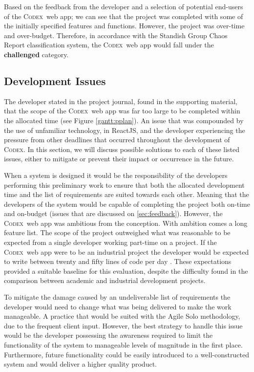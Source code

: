 \documentclass[final]{cmpreport}
\newcommand{\Codex}{\textsc{Codex}}
\begin{document}
		Based on the feedback from the developer and a selection of potential end-users of the \Codex \ web app; we can see that the project was completed with some of the initially specified features and functions. However, the project was over-time and over-budget. Therefore, in accordance with the Standish Group Chaos Report classification system, the \Codex \ web app would fall under the \textbf{challenged} category.
		
		\subsection{Development Issues} \label{sec:dev-eval}
		The developer stated in the project journal, found in the supporting material, that the scope of the \Codex \ web app was far too large to be completed within the allocated time (see Figure \ref{gantt:pplan}). An issue that was compounded by the use of unfamiliar technology, in ReactJS, and the developer experiencing the pressure from other deadlines that occurred throughout the development of \Codex. In this section, we will discuss possible solutions to each of these listed issues, either to mitigate or prevent their impact or occurrence in the future. 
		
		When a system is designed it would be the responsibility of the developers performing this preliminary work to ensure that both the allocated development time and the list of requirements are suited towards each other. Meaning that the developers of the system would be capable of completing the project both on-time and on-budget (issues that are discussed on \ref{sec:feedback}). However, the \Codex \ web app was ambitious from the conception. With ambition comes a long feature list. The scope of the project outweighed what was reasonable to be expected from a single developer working part-time on a project. If the \Codex \ web app were to be an industrial project the developer would be expected to write between twenty and fifty lines of code per day \citep{dev-metrics}. These expectations provided a suitable baseline for this evaluation, despite the difficulty found in the comparison between academic and industrial development projects.
		
		To mitigate the damage caused by an undeliverable list of requirements the developer would need to change what was being delivered to make the work manageable. A practice that would be suited with the Agile Solo methodology, due to the frequent client input. However, the best strategy to handle this issue would be the developer possessing the awareness required to limit the functionality of the system to manageable levels of magnitude in the first place. Furthermore, future functionality could be easily introduced to a well-constructed system and would deliver a higher quality product.
		
\end{document}
